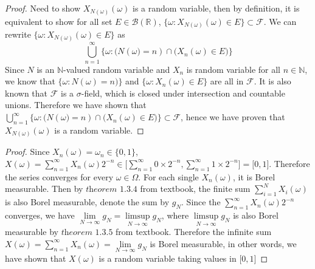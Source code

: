 \documentclass[10pt]{article}
\newenvironment{problem}[2][Problem]{\begin{trivlist}
\item[\hskip \labelsep {\bfseries #1}\hskip \labelsep {\bfseries #2.}]}{\end{trivlist}}
\begin{document}
\begin{problem}{3}
\end{problem}
\begin{proof}
Need to show $X_{N(\omega)}(\omega)$ is a random variable, then by definition, it is equivalent to show for all set $E \in \mathcal{B}(\mathbb{R})$, $\{\omega: X_{N(\omega)}(\omega) \in E\} \subset \mathcal{F}$. We can rewrite $\{\omega: X_{N(\omega)}(\omega) \in E\}$ as $$\bigcup\limits_{n=1}^{\infty} \Big\{\omega: \big(N(\omega\big)=n) \cap \big(X_{n}(\omega) \in E\big)\Big\}$$ Since $N$ is an $\mathbb{N}$-valued random variable and $X_{n}$ is random variable for all $n \in \mathbb{N}$, we know that $\{\omega: N(\omega) =n)\}$ and $\{\omega: X_{n}(\omega) \in E\}$ are all in $\mathcal{F}$. It is also known that $\mathcal{F}$ is a $\sigma$-field, which is closed under intersection and countable unions. Therefore we have shown that $\bigcup\limits_{n=1}^{\infty} \Big\{\omega: \big(N(\omega\big)=n) \cap \big(X_{n}(\omega) \in E\big)\Big\} \subset \mathcal{F}$, hence we have proven that $X_{N(\omega)}(\omega)$ is a random variable.
\end{proof}


\begin{problem}{4(a)}
\end{problem}
\begin{proof}
Since $X_{n}(\omega) = \omega_{n} \in \{0,1\}$, $X(\omega) = \sum_{n=1}^{\infty}X_{n}(\omega)2^{-n} \in \Big[\sum_{n=1}^{\infty}0\times2^{-n}, \sum_{n=1}^{\infty}1\times2^{-n}\Big]= \big[0, 1\big]$. Therefore the series converges for every $\omega \in \Omega$. For each single $X_{n}(\omega)$, it is Borel measurable. Then by $\textit{theorem 1.3.4}$ from textbook, the finite sum $\sum\limits_{i=1}^{N}X_{i}(\omega)$ is also Borel measurable, denote the sum by $g_{N}$. Since the $\sum_{n=1}^{\infty}X_{n}(\omega)2^{-n}$ converges, we have $\lim\limits_{N\rightarrow \infty} g_{N} = \limsup\limits_{N\rightarrow \infty} g_{N}$, where $\limsup\limits_{N\rightarrow \infty} g_{N}$ is also Borel measurable by $\textit{theorem 1.3.5}$ from textbook. Therefore the infinite sum $X(\omega) = \sum\limits_{n=1}^{\infty}X_{n}(\omega) = \lim\limits_{N\rightarrow \infty} g_{N}$ is Borel measurable, in other words, we have shown that $X(\omega)$ is a random variable taking values in $\big[0, 1\big]$
\end{proof}
\end{document}
